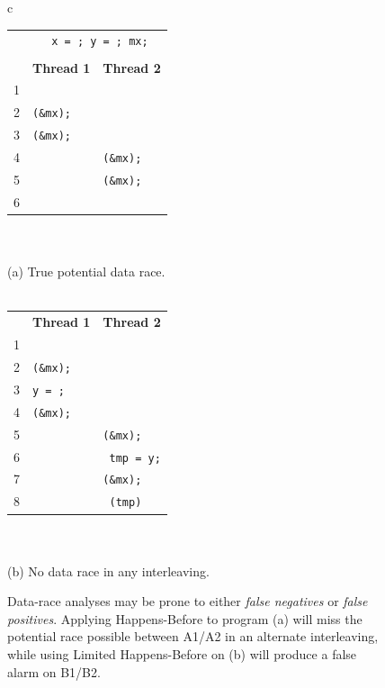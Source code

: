 \begin{figure}[h]
        \small
	\begin{center}
\begin{tabular}{c}
\begin{tabular}{rll}
	& \multicolumn{2}{c}{\texttt{\ctype{int} x = \const{0}; \ctype{bool} y = \const{false}; \ctype{mutex\_t} mx;}} \\
        \\
        & {\bf Thread 1} & {\bf Thread 2} \\
	1 & \texttt{\hilight{brickred}{x++;}~\ccomment{// A1}} & \\
	2 & \texttt{\call{mutex\_lock}(\&mx);} & \\
	3 & \texttt{\call{mutex\_unlock}(\&mx);} & \\
	4 & & \texttt{\call{mutex\_lock}(\&mx);} \\
	5 & & \texttt{\call{mutex\_unlock}(\&mx);} \\
	6 & & \texttt{\hilight{brickred}{x++;}~\ccomment{// A2}} \\
\end{tabular}
\\
\\
	{\normalsize (a) True potential data race.}
\\
\\
\begin{tabular}{rll}
        & {\bf Thread 1} & {\bf Thread 2} \\
	1 & \texttt{\hilight{brickred}{x++;}~\ccomment{// B1}} & \\
	2 & \texttt{\call{mutex\_lock}(\&mx);} & \\
	3 & \texttt{y = \const{true};} & \\
	4 & \texttt{\call{mutex\_unlock}(\&mx);} & \\
	5 & & \texttt{\call{mutex\_lock}(\&mx);} \\
	6 & & \texttt{\ctype{bool} tmp = y;} \\
	7 & & \texttt{\call{mutex\_unlock}(\&mx);} \\
	8 & & \texttt{\flow{if} (tmp) \hilight{brickred}{x++;}~\ccomment{// B2}} \\
\end{tabular}
\\
\\
{\normalsize (b) No data race in any interleaving.}
\end{tabular}
	\end{center}
	\caption[Data-race analyses may be prone to either {\em false negatives} or {\em false positives}.]
		{{Data-race analyses may be prone to either {\em false negatives} or {\em false positives}.
	Applying Happens-Before to program (a) will miss the potential race possible between A1/A2 in an alternate interleaving,
	while using Limited Happens-Before on (b) will produce a false alarm on B1/B2.}}
\label{fig:hb-example}
\end{figure}

